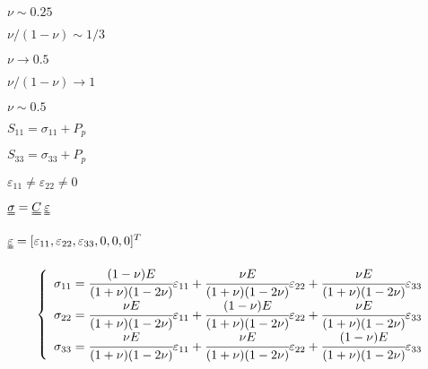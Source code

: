 \documentclass[onecolumn,11pt]{report}
\def\lthtmlcheckvsize{\ifdim\ht\sizebox<\vsize 
  \ifdim\wd\sizebox<\hsize\expandafter\hfill\fi \expandafter\vfill
  \else\expandafter\vss\fi}%
\begin{document}
{\newpage\clearpage
{}%
$ \nu \sim 0.25$%
\lthtmlindisplaymathZ
\lthtmlcheckvsize\clearpage}

{\newpage\clearpage
{}%
$ \nu/(1-\nu) \sim 1/3 $%
\lthtmlindisplaymathZ
\lthtmlcheckvsize\clearpage}

{\newpage\clearpage
{}%
$ \nu \rightarrow 0.5$%
\lthtmlindisplaymathZ
\lthtmlcheckvsize\clearpage}

{\newpage\clearpage
{}%
$ \nu/(1-\nu) \rightarrow 1$%
\lthtmlindisplaymathZ
\lthtmlcheckvsize\clearpage}

{\newpage\clearpage
{}%
$ \nu \sim 0.5$%
\lthtmlindisplaymathZ
\lthtmlcheckvsize\clearpage}

{\newpage\clearpage
{}%
$ S_{11} = \sigma_{11} + P_p$%
\lthtmlindisplaymathZ
\lthtmlcheckvsize\clearpage}

{\newpage\clearpage
{}%
$ S_{33} = \sigma_{33} + P_p$%
\lthtmlindisplaymathZ
\lthtmlcheckvsize\clearpage}

{\newpage\clearpage
{}%
$ \varepsilon_{11} \neq \varepsilon_{22} \neq 0$%
\lthtmlindisplaymathZ
\lthtmlcheckvsize\clearpage}

{\newpage\clearpage
{}%
$ \uuline{\sigma} = \uuline{C} \: \uuline{\varepsilon}$%
\lthtmlindisplaymathZ
\lthtmlcheckvsize\clearpage}

{\newpage\clearpage
{}%
$ \uuline{\varepsilon} = [\varepsilon_{11},\varepsilon_{22},\varepsilon_{33},0,0,0]^T$%
\lthtmlindisplaymathZ
\lthtmlcheckvsize\clearpage}

{\newpage\clearpage
{}%
\begin{displaymath}\left\lbrace
\begin{array}{l}
\sigma_{11} =
\cfrac{(1-\nu) E}{(1+\nu)(1-2\nu)} \varepsilon_{11}
+ \cfrac{\nu E}{(1+\nu)(1-2\nu)} \varepsilon_{22}
+ \cfrac{\nu E}{(1+\nu)(1-2\nu)} \varepsilon_{33} \\
\sigma_{22} =
\cfrac{\nu E}{(1+\nu)(1-2\nu)} \varepsilon_{11}
+ \cfrac{(1-\nu) E}{(1+\nu)(1-2\nu)} \varepsilon_{22}
+ \cfrac{\nu E}{(1+\nu)(1-2\nu)} \varepsilon_{33} \\
\sigma_{33} =
\cfrac{\nu E}{(1+\nu)(1-2\nu)} \varepsilon_{11}
+   \cfrac{\nu E}{(1+\nu)(1-2\nu)} \varepsilon_{22}
+	\cfrac{(1-\nu) E}{(1+\nu)(1-2\nu)} \varepsilon_{33}
\end{array}
\right.\end{displaymath}%
\lthtmldisplayZ
\lthtmlcheckvsize\clearpage}
\end{document}
